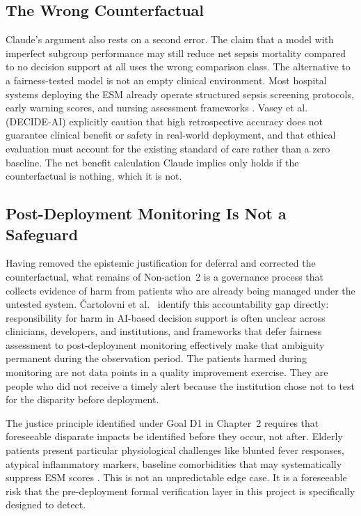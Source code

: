 \documentclass[]{UCD_CS_41820_Report}
\begin{document}
\subsection*{The Wrong Counterfactual}

Claude's argument also rests on a second error. The claim that a model with
imperfect subgroup performance may still reduce net sepsis mortality compared to
no decision support at all uses the wrong comparison class. The alternative to a
fairness-tested model is not an empty clinical environment. Most hospital systems
deploying the ESM already operate structured sepsis screening protocols, early
warning scores, and nursing assessment frameworks \cite{shwedeh2025}. Vasey et al.\
\cite{vasey2022} (DECIDE-AI) explicitly caution that high retrospective accuracy
does not guarantee clinical benefit or safety in real-world deployment, and that
ethical evaluation must account for the existing standard of care rather than a
zero baseline. The net benefit calculation Claude implies only holds if the
counterfactual is nothing, which it is not.

\subsection*{Post-Deployment Monitoring Is Not a Safeguard}

Having removed the epistemic justification for deferral and corrected the
counterfactual, what remains of Non-action~2 is a governance process that collects
evidence of harm from patients who are already being managed under the untested
system. \v{C}artolovni et al.\ \cite{cartoloni2022} identify this accountability
gap directly: responsibility for harm in AI-based decision support is often unclear
across clinicians, developers, and institutions, and frameworks that defer fairness
assessment to post-deployment monitoring effectively make that ambiguity permanent
during the observation period. The patients harmed during monitoring are not data
points in a quality improvement exercise. They are people who did not receive a
timely alert because the institution chose not to test for the disparity before
deployment.

The justice principle identified under Goal D1 in Chapter~2 requires that
foreseeable disparate impacts be identified before they occur, not after. Elderly
patients present particular physiological challenges like blunted fever responses,
atypical inflammatory markers, baseline comorbidities that may systematically
suppress ESM scores \cite{cull2023}. This is not an unpredictable edge case. It is
a foreseeable risk that the pre-deployment formal verification layer in this project
is specifically designed to detect.
\end{document}
